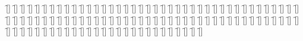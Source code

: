 \begin{questions}
\begin{multicols}{2}
        \question  \f[]
        \question  \f[]
        \question  \f[]
        \question  \f[]
        \question  \f[]
        \question  \f[]
        \question  \f[]
        \question  \f[]
        \question  \f[]
        \question  \f[]
        \question  \f[]
        \question  \f[]
        \question  \f[]
        \question  \f[]
        \question  \f[]
        \question  \f[]
        \question  \f[]
        \question  \f[]
        \question  \f[]
        \question  \f[]
        \question  \f[]
        \question  \f[]
        \question  \f[]
        \question  \f[]
        \question  \f[]
        \question  \f[]
        \question  \f[]
        \question  \f[]
        \question  \f[]
        \question  \f[]
        \question  \f[]
        \question  \f[]
        \question  \f[]
        \question  \f[]
        \question  \f[]
        \question  \f[]
        \question  \f[]
        \question  \f[]
        \question  \f[]
        \question  \f[]
        \question  \f[]
        \question  \f[]
        \question  \f[]
        \question  \f[]
        \question  \f[]
        \question  \f[]
        \question  \f[]
        \question  \f[]
        \question  \f[]
        \question  \f[]
        \question  \f[]
        \question  \f[]
        \question  \f[]
        \question  \f[]
        \question  \f[]
        \question  \f[]
        \question  \f[]
        \question  \f[]
        \question  \f[]
        \question  \f[]
        \question  \f[]
        \question  \f[]
        \question  \f[]
        \question  \f[]
        \question  \f[]
        \question  \f[]
        \question  \f[]
        \question  \f[]
        \question  \f[]
        \question  \f[]
        \question  \f[]
        \question  \f[]
        \question  \f[]
        \question  \f[]
        \question  \f[]
        \question  \f[]
        \question  \f[]
        \question  \f[]
        \question  \f[]
        \question  \f[]
        \question  \f[]
        \question  \f[]
        \question  \f[]
        \question  \f[]
        \question  \f[]
        \question  \f[]
        \question  \f[]
        \question  \f[]
        \question  \f[]
        \question  \f[]
        \question  \f[]
        \question  \f[]
        \question  \f[]
        \question  \f[]
        \question  \f[]
        \question  \f[]
        \question  \f[]
        \question  \f[]
        \question  \f[]
        \question  \f[]
        \question  \f[]
        \question  \f[]
        \question  \f[]
        \question  \f[]
        \question  \f[]
        \question  \f[]
        \question  \f[]
    \end{multicols}
\end{questions}
